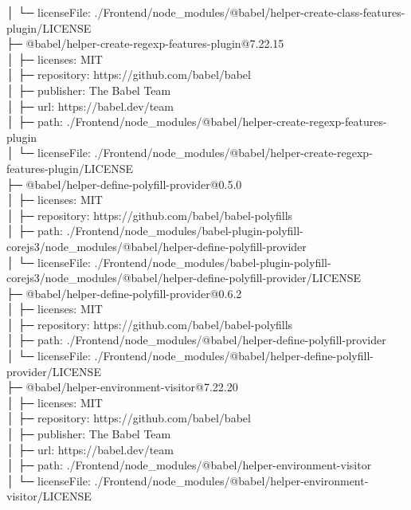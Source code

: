 \documentclass[
    paper=a4,
    twoside=false,
    parskip=half,
    listof=entryprefix,
    listof=totoc,
    index=totoc,
    bibliography=totoc,
    headsepline,
]{scrbook}
\begin{document}
    │  └─ licenseFile: ./Frontend/node\_modules/@babel/helper-create-class-features-plugin/LICENSE\\
    ├─ @babel/helper-create-regexp-features-plugin@7.22.15\\
    │  ├─ licenses: MIT\\
    │  ├─ repository: https://github.com/babel/babel\\
    │  ├─ publisher: The Babel Team\\
    │  ├─ url: https://babel.dev/team\\
    │  ├─ path: ./Frontend/node\_modules/@babel/helper-create-regexp-features-plugin\\
    │  └─ licenseFile: ./Frontend/node\_modules/@babel/helper-create-regexp-features-plugin/LICENSE\\
    ├─ @babel/helper-define-polyfill-provider@0.5.0\\
    │  ├─ licenses: MIT\\
    │  ├─ repository: https://github.com/babel/babel-polyfills\\
    │  ├─ path: ./Frontend/node\_modules/babel-plugin-polyfill-corejs3/node\_modules/@babel/helper-define-polyfill-provider\\
    │  └─ licenseFile: ./Frontend/node\_modules/babel-plugin-polyfill-corejs3/node\_modules/@babel/helper-define-polyfill-provider/LICENSE\\
    ├─ @babel/helper-define-polyfill-provider@0.6.2\\
    │  ├─ licenses: MIT\\
    │  ├─ repository: https://github.com/babel/babel-polyfills\\
    │  ├─ path: ./Frontend/node\_modules/@babel/helper-define-polyfill-provider\\
    │  └─ licenseFile: ./Frontend/node\_modules/@babel/helper-define-polyfill-provider/LICENSE\\
    ├─ @babel/helper-environment-visitor@7.22.20\\
    │  ├─ licenses: MIT\\
    │  ├─ repository: https://github.com/babel/babel\\
    │  ├─ publisher: The Babel Team\\
    │  ├─ url: https://babel.dev/team\\
    │  ├─ path: ./Frontend/node\_modules/@babel/helper-environment-visitor\\
    │  └─ licenseFile: ./Frontend/node\_modules/@babel/helper-environment-visitor/LICENSE\\
\end{document}
